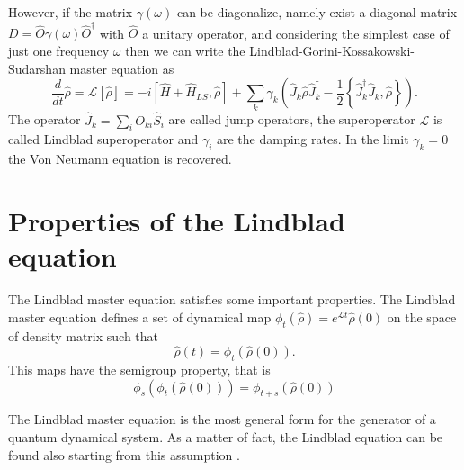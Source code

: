 However, if the matrix $\gamma(\omega)$ can be diagonalize, namely exist a diagonal matrix $D=\hat O \gamma(\omega) \hat O^\dagger$ with $\hat O$ a unitary operator, and considering the simplest case of just one frequency $\omega$ then we can write the Lindblad-Gorini-Kossakowski-Sudarshan master equation as
\begin{equation}\label{Lindbladian}
    \frac{d}{dt}\hat\rho =\mathcal{L}\left[\hat\rho\right] = -i\left[\hat H+\hat H_{LS},\hat\rho\right] + \sum_k \gamma_k \left(\hat J_k \hat\rho \hat J^\dagger_k - \frac{1}{2}\left\{ \hat J^\dagger_k\hat J_k, \hat\rho\right\} \right).
\end{equation}
The operator $\hat J_k= \sum_i O_{ki} \hat S_{i}$ are called jump operators, the superoperator $\mathcal{L}$ is called Lindblad superoperator and $\gamma_i$ are the damping rates. In the limit $\gamma_k = 0$ the Von Neumann equation is recovered.



\section{Properties of the Lindblad equation}
The Lindblad master equation satisfies some important properties.
The Lindblad master equation defines a set of dynamical map $\phi_t\left(\hat\rho\right)= e^{\mathcal{L}t}\hat\rho(0)$ on the space of density matrix such that
\begin{equation}
    \hat\rho(t) = \phi_t\left(\hat\rho(0)\right).
\end{equation}
This maps have the semigroup property, that is
\begin{equation}
    \phi_s\left(\phi_t\left(\hat\rho(0)\right)\right)=\phi_{t+s}\left(\hat\rho(0)\right)
\end{equation}

The Lindblad master equation is the most general form for the generator of a quantum dynamical system. As a matter of fact, the Lindblad equation can be found also starting from this assumption \cite{Breuer-Petruccione}.

